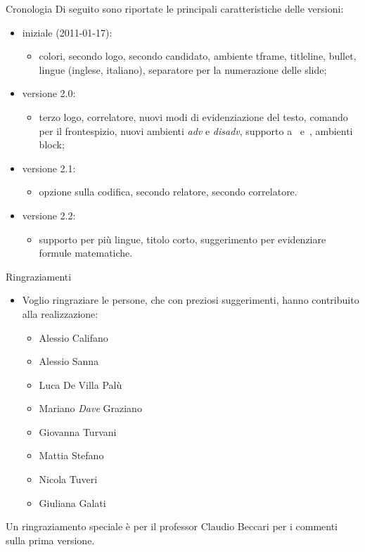 \begin{tframe}{Cronologia}
Di seguito sono riportate le principali caratteristiche delle versioni:
\begin{itemize}
\item iniziale (2011-01-17):
\begin{itemize}
\item colori, secondo logo, secondo candidato, ambiente tframe, titleline, bullet, lingue (inglese, italiano), separatore per la numerazione delle slide; 
\end{itemize}
\item versione 2.0:
\begin{itemize}
\item terzo logo, correlatore, nuovi modi di evidenziazione del testo, comando per il frontespizio, nuovi ambienti \emph{adv} e \emph{disadv}, supporto a \XeTeX\, e \XeLaTeX\,, ambienti block;
\end{itemize}
\item versione 2.1:
\begin{itemize}
\item opzione sulla codifica, secondo relatore, secondo correlatore.
\end{itemize}
\item versione 2.2:
\begin{itemize}
\item supporto per più lingue, titolo corto, suggerimento per evidenziare formule matematiche.
\end{itemize}
\end{itemize}
\end{tframe}

\begin{tframe}{Ringraziamenti}
\begin{itemize}
\item Voglio ringraziare le persone, che con preziosi suggerimenti, hanno contribuito alla realizzazione:
\begin{itemize}
\item Alessio Califano
\item Alessio Sanna
\item Luca De Villa Palù
\item Mariano \emph{Dave} Graziano
\item Giovanna Turvani
\item Mattia Stefano
\item Nicola Tuveri
\item Giuliana Galati
\end{itemize}
\end{itemize}
Un ringraziamento speciale è per il professor Claudio Beccari per i commenti sulla prima versione.
\end{tframe}